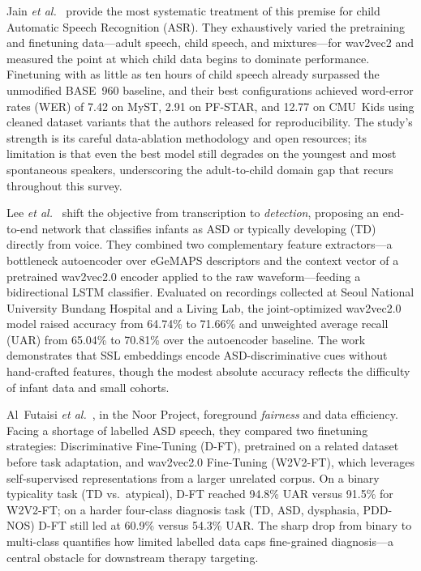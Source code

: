 \documentclass[conference]{IEEEtran}
\begin{document}
Jain \textit{et al.}~\cite{ref1} provide the most systematic treatment of this premise for child Automatic Speech Recognition (ASR). They exhaustively varied the pretraining and finetuning data---adult speech, child speech, and mixtures---for wav2vec2 and measured the point at which child data begins to dominate performance. Finetuning with as little as ten hours of child speech already surpassed the unmodified BASE~960 baseline, and their best configurations achieved word-error rates (WER) of 7.42 on MyST, 2.91 on PF-STAR, and 12.77 on CMU~Kids using cleaned dataset variants that the authors released for reproducibility. The study's strength is its careful data-ablation methodology and open resources; its limitation is that even the best model still degrades on the youngest and most spontaneous speakers, underscoring the adult-to-child domain gap that recurs throughout this survey.

Lee \textit{et al.}~\cite{ref2} shift the objective from transcription to \emph{detection}, proposing an end-to-end network that classifies infants as ASD or typically developing (TD) directly from voice. They combined two complementary feature extractors---a bottleneck autoencoder over eGeMAPS descriptors and the context vector of a pretrained wav2vec2.0 encoder applied to the raw waveform---feeding a bidirectional LSTM classifier. Evaluated on recordings collected at Seoul National University Bundang Hospital and a Living Lab, the joint-optimized wav2vec2.0 model raised accuracy from 64.74\% to 71.66\% and unweighted average recall (UAR) from 65.04\% to 70.81\% over the autoencoder baseline. The work demonstrates that SSL embeddings encode ASD-discriminative cues without hand-crafted features, though the modest absolute accuracy reflects the difficulty of infant data and small cohorts.

Al~Futaisi \textit{et al.}~\cite{ref3}, in the Noor Project, foreground \emph{fairness} and data efficiency. Facing a shortage of labelled ASD speech, they compared two finetuning strategies: Discriminative Fine-Tuning (D-FT), pretrained on a related dataset before task adaptation, and wav2vec2.0 Fine-Tuning (W2V2-FT), which leverages self-supervised representations from a larger unrelated corpus. On a binary typicality task (TD vs.\ atypical), D-FT reached 94.8\% UAR versus 91.5\% for W2V2-FT; on a harder four-class diagnosis task (TD, ASD, dysphasia, PDD-NOS) D-FT still led at 60.9\% versus 54.3\% UAR. The sharp drop from binary to multi-class quantifies how limited labelled data caps fine-grained diagnosis---a central obstacle for downstream therapy targeting.
\end{document}
